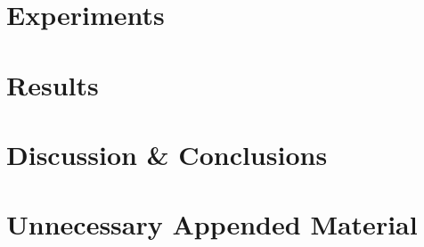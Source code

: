 \documentclass{kththesis}
\theoremstyle{definition}
\begin{document}
\chapter{Experiments}

\chapter{Results}

\chapter{Discussion \& Conclusions}

\printbibliography[heading=bibintoc] %

\appendix

\chapter{Unnecessary Appended Material}
\end{document}
